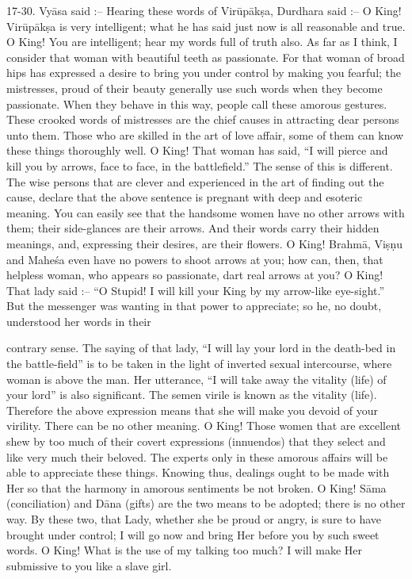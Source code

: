 17-30. Vy\=asa said :-- Hearing these words of Vir\=up\=ak\d{s}a, Durdhara said :-- O King! Vir\=up\=ak\d{s}a is very intelligent; what he has said just now is all reasonable and true. O King! You are intelligent; hear my words full of truth also. As far as I think, I consider that woman with beautiful teeth as passionate. For that woman of broad hips has expressed a desire to bring you under control by making you fearful; the mistresses, proud of their beauty generally use such words when they become passionate. When they behave in this way, people call these amorous gestures. These crooked words of mistresses are the chief causes in attracting dear persons unto them. Those who are skilled in the art of love affair, some of them can know these things thoroughly well. O King! That woman has said, ``I will pierce and kill you by arrows, face to face, in the battlefield.'' The sense of this is different. The wise persons that are clever and experienced in the art of finding out the cause, declare that the above sentence is pregnant with deep and esoteric meaning. You can easily see that the handsome women have no other arrows with them; their side-glances are their arrows. And their words carry their hidden meanings, and, expressing their desires, are their flowers. O King! Brahm\=a, Vi\d{s}\d{n}u and Mahe\'sa even have no powers to shoot arrows at you; how can, then, that helpless woman, who appears so passionate, dart real arrows at you? O King! That lady said :-- ``O Stupid! I will kill your King by my arrow-like eye-sight.'' But the messenger was wanting in that power to appreciate; so he, no doubt, understood her words in their

contrary sense. The saying of that lady, ``I will lay your lord in the death-bed in the battle-field'' is to be taken in the light of inverted sexual intercourse, where woman is above the man. Her utterance, ``I will take away the vitality (life) of your lord'' is also significant. The semen virile is known as the vitality (life). Therefore the above expression means that she will make you devoid of your virility. There can be no other meaning. O King! Those women that are excellent shew by too much of their covert expressions (innuendos) that they select and like very much their beloved. The experts only in these amorous affairs will be able to appreciate these things. Knowing thus, dealings ought to be made with Her so that the harmony in amorous sentiments be not broken. O King! S\=ama (conciliation) and D\=ana (gifts) are the two means to be adopted; there is no other way. By these two, that Lady, whether she be proud or angry, is sure to have brought under control; I will go now and bring Her before you by such sweet words. O King! What is the use of my talking too much? I will make Her submissive to you like a slave girl.

